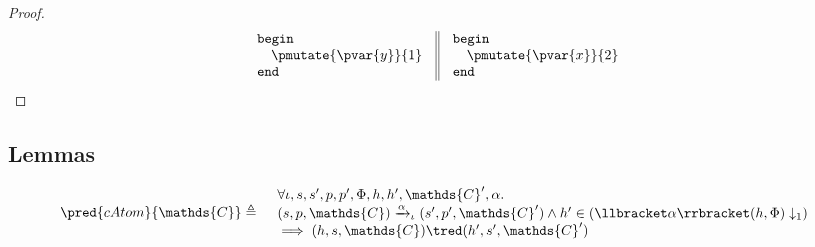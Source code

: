 {\begin{proof}
\[
\begin{array}{l || l}
\begin{array}{l}
\mathtt{begin}\\
\quad \pmutate{\pvar{y}}{1} \\
\mathtt{end}
\end{array}
&
\begin{array}{l}
\mathtt{begin}\\
\quad \pmutate{\pvar{x}}{2} \\
\mathtt{end}
\end{array}
\end{array}
\]
\end{proof}
}

\subsection{Lemmas}

\lem \label{lem:catom}
\[
\begin{array}{r l}
	\pred{cAtom}{\mathds{C}} \triangleq&
	\begin{array}{l}
	\forall \iota, s, s', p, p', \Phi, h, h', \mathds{C}', \alpha \ldotp \\
	(s, p, \mathds{C}) \xrightarrow{\alpha}_\iota (s', p', \mathds{C}') \land h' \in \left( \llbracket \alpha \rrbracket(h, \Phi) \downarrow_1 \right) \\
	\implies
	(h, s, \mathds{C}) \tred (h', s', \mathds{C}')
	\end{array}
\end{array}
\]

